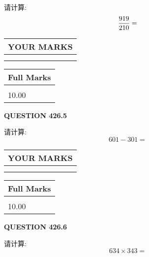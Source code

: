 \documentclass{ctexart}
\begin{document}
  
 
请计算:
\begin{equation}
\frac { %
919 }  {  %
210} = \nonumber
\end{equation}
 

 

 
  
\vspace{0.2in}
  
\noindent\begin{tabular}{|l|}
\hline
 YOUR MARKS  \\
\hline
 \\ 
 \\ 
\hline
\end{tabular}
\hspace{0.05in} \begin{tabular}{|l|}
\hline
 Full Marks  \\
\hline
 \\ 
10.00 \\
\hline
\end{tabular}
{\textbf{\Large{QUESTION
426.5 
}}}
  
  
 
请计算:
\begin{equation}
601 -   %
301 = \nonumber
\end{equation}
 

 

 
  
\vspace{0.2in}
  
\noindent\begin{tabular}{|l|}
\hline
 YOUR MARKS  \\
\hline
 \\ 
 \\ 
\hline
\end{tabular}
\hspace{0.05in} \begin{tabular}{|l|}
\hline
 Full Marks  \\
\hline
 \\ 
10.00 \\
\hline
\end{tabular}
{\textbf{\Large{QUESTION
426.6 
}}}
  
  
 
请计算:
\begin{equation}
634  \times    %
343 = \nonumber
\end{equation}
 

 
\end{document}
